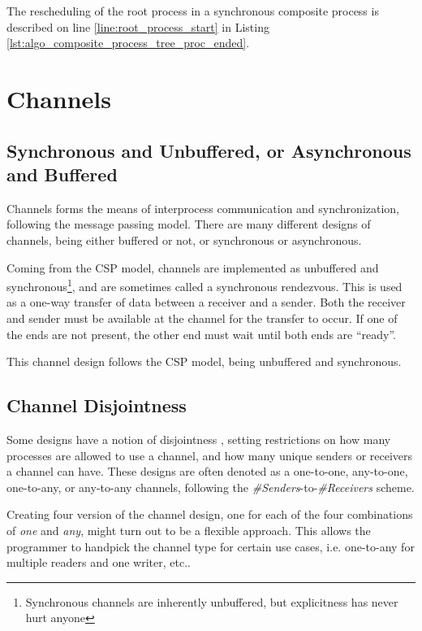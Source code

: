 The rescheduling of the root process in a synchronous composite process is described on line \ref{line:root_process_start} in Listing \ref{lst:algo_composite_process_tree_proc_ended}.

\section{Channels}

\subsection{Synchronous and Unbuffered, or Asynchronous and Buffered}

Channels forms the means of interprocess communication and synchronization, following the message passing model. There are many different designs of channels, being either buffered or not, or synchronous or asynchronous. 

Coming from the CSP model, channels are implemented as unbuffered and synchronous\footnote{Synchronous channels are inherently unbuffered, but explicitness has never hurt anyone}, and are sometimes called a synchronous rendezvous. This is used as a one\hyp{}way transfer of data between a receiver and a sender. Both the receiver and sender must be available at the channel for the transfer to occur. If one of the ends are not present, the other end must wait until both ends are ``ready''.

This channel design follows the CSP model, being unbuffered and synchronous.

\subsection{Channel Disjointness}

Some designs have a notion of disjointness \citep[see][chapter 3.3.1]{xc}, setting restrictions on how many processes are allowed to use a channel, and how many unique senders or receivers a channel can have. These designs are often denoted as a one\hyp{}to\hyp{}one, any\hyp{}to\hyp{}one, one\hyp{}to\hyp{}any, or any\hyp{}to\hyp{}any channels, following the \textit{\#Senders}\hyp{}to\hyp{}\textit{\#Receivers} scheme.

Creating four version of the channel design, one for each of the four combinations of \textit{one} and \textit{any}, might turn out to be a flexible approach. This allows the programmer to handpick the channel type for certain use cases, i.e.  one\hyp{}to\hyp{}any for multiple readers and one writer, etc.. 


